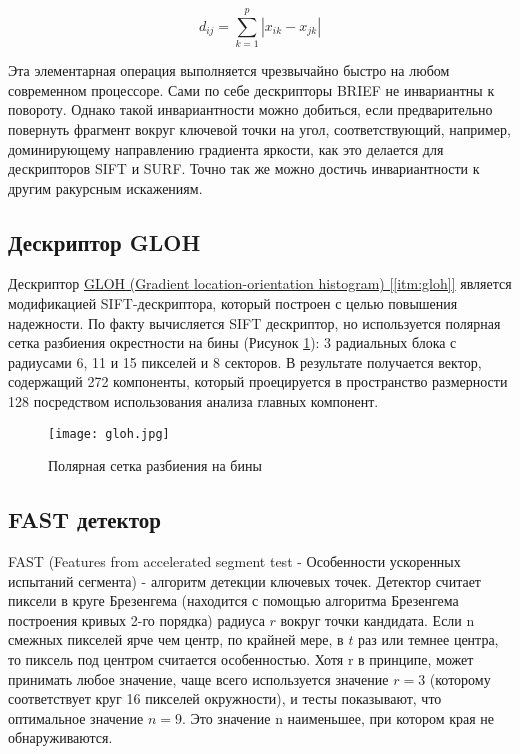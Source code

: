 \begin{equation}
    d_{ij} = \sum_{k=1}^{p}|x_{ik} - x_{jk}|
\end{equation}

Эта элементарная операция выполняется чрезвычайно быстро на любом современном процессоре. Сами по себе дескрипторы BRIEF не инвариантны к повороту. Однако такой инвариантности можно добиться, если предварительно повернуть фрагмент вокруг ключевой точки на угол, соответствующий, например, доминирующему направлению градиента яркости, как это делается для дескрипторов SIFT и SURF. Точно так же можно достичь инвариантности к другим ракурсным искажениям.

\subsection{Дескриптор GLOH}

Дескриптор \hyperref[itm:gloh]{ GLOH (Gradient location-orientation histogram) [\ref{itm:gloh}]} является модификацией SIFT-дескриптора, который построен с целью повышения надежности. По факту вычисляется SIFT дескриптор, но используется полярная сетка разбиения окрестности на бины (Рисунок \ref{fig:gloh}): 3 радиальных блока с радиусами 6, 11 и 15 пикселей и 8 секторов. В результате получается вектор, содержащий 272 компоненты, который проецируется в пространство размерности 128 посредством использования анализа главных компонент.

\begin{figure}[h]
    \centering
    \texttt{[image: gloh.jpg]}
    \caption{Полярная сетка разбиения на бины}
    \label{fig:gloh}
\end{figure}

\subsection{FAST детектор}

FAST (Features from accelerated segment test - Особенности ускоренных испытаний сегмента) - алгоритм детекции ключевых точек. Детектор считает пиксели в круге Брезенгема (находится с помощью алгоритма Брезенгема построения кривых 2-го порядка) радиуса $r$ вокруг точки кандидата. Если n смежных пикселей ярче чем центр, по крайней мере, в $t$ раз или темнее центра, то пиксель под центром считается особенностью. Хотя r в принципе, может принимать любое значение, чаще всего используется значение $r=3$  (которому соответствует круг 16 пикселей окружности), и тесты показывают, что оптимальное значение $n=9$. Это значение n наименьшее, при котором края не обнаруживаются.


